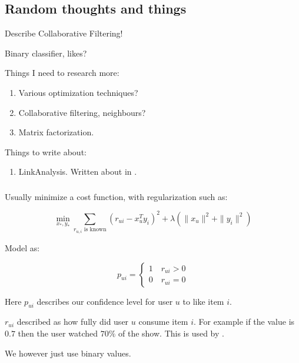 
\subsection{Random thoughts and things}

Describe Collaborative Filtering!

Binary classifier, likes?

Things I need to research more:

\begin{enumerate}
    \item Various optimization techniques?
    \item Collaborative filtering, neighbours? \cite{hu2008collaborative}
    \item Matrix factorization.
\end{enumerate}

Things to write about:

\begin{enumerate}
    \item LinkAnalysis. Written about in \cite{huang2007comparison}.
\end{enumerate}


\subsubsection{\cite{hu2008collaborative}}

Usually minimize a cost function, with regularization such as:

\begin{equation}
    \min_{x_*, y_*} \sum_{r_{u,i} \text{ is known} } (r_{ui} - x_{u}^T y_i)^2 + \lambda(\|x_u\|^2 + \|y_i\|^2)
\end{equation}

Model as:

\begin{equation}
    p_{ui} = \begin{cases}
        1 \quad r_{ui} > 0 \\
        0 \quad r_{ui} = 0
    \end{cases}
\end{equation}

Here $p_{ui}$ describes our confidence level for user $u$ to like item $i$.

$r_{ui}$ described as how fully did user $u$ consume item $i$. For example if the value is $0.7$ then the user watched $70\%$ of the show. This is used by \cite{hu2008collaborative}.

We however just use binary values.

